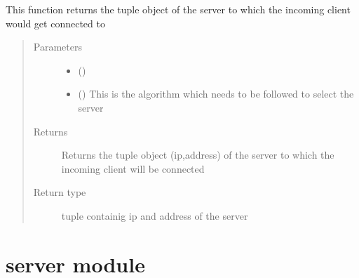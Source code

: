 \documentclass[letterpaper,10pt,english]{sphinxmanual}
\begin{document}
\begin{fulllineitems}
\label{\detokenize{loadbalancer:loadbalancer.select_server}}
\sphinxAtStartPar
This function returns the tuple object of the server to which the incoming client would get connected to
\begin{quote}\begin{description}
\item[{Parameters}] \leavevmode\begin{itemize}
\item {} 
\sphinxAtStartPar
{} () \textendash{} 

\item {} 
\sphinxAtStartPar
{} () \textendash{} This is the algorithm which needs to be followed to select the server

\end{itemize}

\item[{Returns}] \leavevmode
\sphinxAtStartPar
Returns the tuple object (ip,address) of the server to which the incoming client will be connected

\item[{Return type}] \leavevmode
\sphinxAtStartPar
tuple containig ip and address of the server

\end{description}\end{quote}

\end{fulllineitems}



\section{server module}
\label{\detokenize{server:module-server}}\label{\detokenize{server:server-module}}\label{\detokenize{server::doc}}
\end{document}
